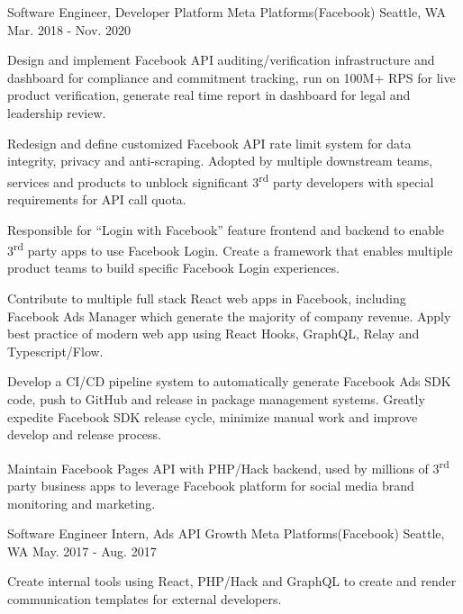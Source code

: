 \begin{cventries}
\cventry
{Software Engineer, Developer Platform} %
{Meta Platforms(Facebook)} %
{Seattle, WA} %
{Mar. 2018 - Nov. 2020} %
{
\begin{cvitems}
	\item Design and implement Facebook API auditing/verification infrastructure and dashboard for compliance and commitment tracking, run on 100M+ RPS for live product verification, generate real time report in dashboard for legal and leadership review. %
    \item Redesign and define customized Facebook API rate limit system for data integrity, privacy and anti-scraping. Adopted by multiple downstream teams, services and products to unblock significant 3\textsuperscript{rd} party developers with special requirements for API call quota. %
    \item{Responsible for ``Login with Facebook'' feature frontend and backend to enable 3\textsuperscript{rd} party apps to use Facebook Login. Create a framework that enables multiple product teams to build specific Facebook Login experiences.} %
    \item Contribute to multiple full stack React web apps in Facebook, including Facebook Ads Manager which generate the majority of company revenue. Apply best practice of modern web app using React Hooks, GraphQL, Relay and Typescript/Flow. %
    \item Develop a CI/CD pipeline system to automatically generate Facebook Ads SDK code, push to GitHub and release in package management systems. Greatly expedite Facebook SDK release cycle, minimize manual work and improve develop and release process. %
     \item Maintain Facebook Pages API with PHP/Hack backend, used by millions of 3\textsuperscript{rd} party business apps to leverage Facebook platform for social media brand monitoring and marketing. %
\end{cvitems}
}




\cventry
{Software Engineer Intern, Ads API Growth} %
{Meta Platforms(Facebook)} %
{Seattle, WA} %
{May. 2017 - Aug. 2017} %
{
\begin{cvitems}
\item Create internal tools using React, PHP/Hack and GraphQL to create and render communication templates for external developers.
\end{cvitems}
}


\end{cventries}
